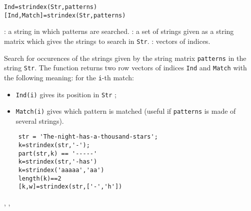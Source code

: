 
\begin{mandesc}
\end{mandesc}
\begin{calling_sequence}
\begin{verbatim}
Ind=strindex(Str,patterns)
[Ind,Match]=strindex(Str,patterns)
\end{verbatim}
\end{calling_sequence}

\begin{parameters}
  \begin{varlist}
    : a string in which patterns are searched.
    : a set of strings given as a string matrix which gives the 
    strings to search in \verb!Str!.
    : vectors of indices.
  \end{varlist}
\end{parameters}

\begin{mandescription}
Search for occurences of the strings given by the string matrix \verb!patterns! 
in the string \verb!Str!. The function returns two row vectors of indices \verb!Ind!
and  \verb!Match! with the following meaning: for the  \verb+i+-th match:
\begin{itemize}
\item \verb+Ind(i)+ gives its position in \verb!Str! ;
\item \verb+Match(i)+ gives which pattern is matched (useful if \verb+patterns+ is made of several strings).
\end{itemize}
\end{mandescription}
\begin{examples}
  \begin{Verbatim}
    str = 'The-night-has-a-thousand-stars';
    k=strindex(str,'-');
    part(str,k) == '-----' 
    k=strindex(str,'-has') 
    k=strindex('aaaaa','aa')
    length(k)==2 
    [k,w]=strindex(str,['-','h'])
  \end{Verbatim}
\end{examples}
\begin{manseealso}
  , ,    
\end{manseealso}
